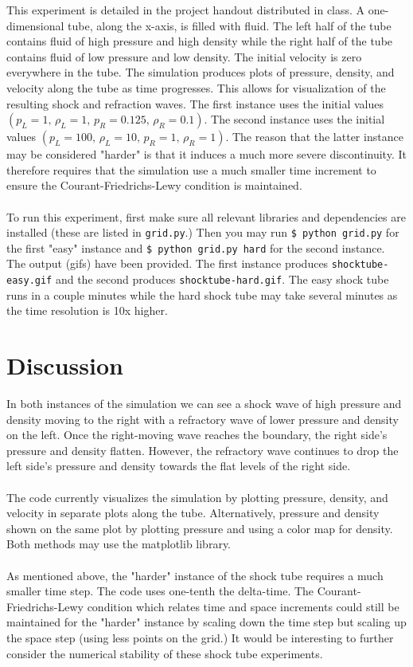 \documentclass[twoside,twocolumn]{article}
\begin{document}
This experiment is detailed in the project handout distributed in class. A one-dimensional tube, along the x-axis, is filled with fluid. The left half of the tube
contains fluid of high pressure and high density while the right half of the tube contains
fluid of low pressure and low density. The initial velocity is zero everywhere in the tube.
The simulation produces plots of pressure, density, and velocity along the tube as time
progresses. This allows for visualization of the resulting shock and refraction waves. The first instance uses the initial values $(p_L=1,\,\rho_L=1,\,p_R=0.125,\,\rho_R=0.1)$. The second instance uses the initial values $(p_L=100,\,\rho_L=10,\,p_R=1,\,\rho_R=1)$. The reason that the latter instance may be considered "harder" is that it induces
a much more severe discontinuity. It therefore requires that the simulation use a much smaller time increment to ensure the Courant-Friedrichs-Lewy condition is maintained.\\\\
To run this experiment, first make sure all relevant libraries and dependencies are installed (these are listed in \texttt{grid.py}.) Then you may run \texttt{\$ python grid.py} for the first "easy" instance and \texttt{\$ python grid.py hard} for the second instance. The output (gifs) have been provided. The first instance produces \texttt{shocktube-easy.gif} and the second produces
\texttt{shocktube-hard.gif}. The easy shock tube runs in a couple minutes while the hard shock tube may take several minutes as the time resolution is 10x higher.


\section{Discussion}

In both instances of the simulation we can see a shock wave of high pressure and density moving to the right with a refractory wave of lower pressure and density on the left. Once the right-moving wave reaches the boundary, the right side's pressure and density flatten. However, the refractory wave continues to drop the left side's pressure and density towards the flat levels of the right side.\\\\
The code currently visualizes the simulation by plotting pressure, density, and velocity in separate plots along the tube. Alternatively, pressure and density shown on the same plot by plotting pressure and using a color map for density. Both methods may use the matplotlib library.\\\\ 
As mentioned above, the "harder" instance of the shock tube requires a much smaller time step. The code uses one-tenth the delta-time. The Courant-Friedrichs-Lewy condition which relates time and space increments could still be maintained for the "harder" instance by scaling down the time step but scaling up the space step (using less points on the grid.) It would be interesting to further consider the numerical stability of these shock tube experiments.
\end{document}
